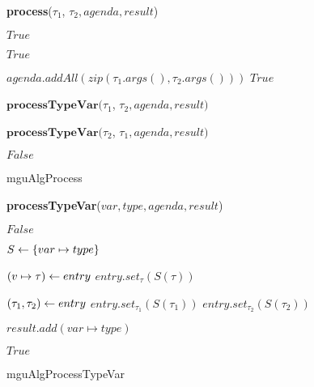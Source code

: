 \documentclass[a4paper,oneside]{memoir}
\begin{document}
{\textbf{process}($\tau_1$, $\tau_2, agenda, result$)}{
	\;
	 {
		\Return $True$
	} \;

	 {
		\Return $True$
	} \;

	 {
		$agenda.addAll(zip(\tau_1.args(), \tau_2.args()))$ \;
		\Return $True$
	} \;
	
	 {
		\Return $\textbf{processTypeVar}(\tau_1$, $\tau_2, agenda, result)$
	} \;
	
	 {
		\Return $\textbf{processTypeVar}(\tau_2$, $\tau_1, agenda, result)$
	} \;	
	
	\Return $False$
	
}{mguAlgProcess}

{\textbf{processTypeVar}($var, type, agenda, result$)}{
	\;
	
	 {
		\Return $False$
	} \;

	$S \leftarrow \{var \mapsto type \}$\;\;

	 {
		$(v \mapsto \tau) \leftarrow entry$ \;
		$entry.set_{\tau}( S(\tau) )$
	} \;

	 {
		$(\tau_1, \tau_2) \leftarrow entry$ \;
		$entry.set_{\tau_1}( S(\tau_1) )$ \;
		$entry.set_{\tau_2}( S(\tau_2) )$
	} \;

	
	$result.add(var \mapsto type)$ \;\;
	
	\Return $True$
	
}{mguAlgProcessTypeVar}
















\backmatter
\end{document}

